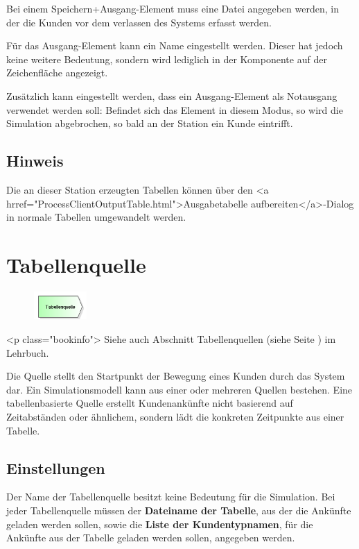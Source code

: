 Bei einem Speichern+Ausgang-Element muss eine Datei angegeben werden, in der die Kunden vor dem verlassen des Systems erfasst werden.

Für das Ausgang-Element kann ein Name eingestellt werden. Dieser hat jedoch keine weitere Bedeutung, sondern wird lediglich
in der Komponente auf der Zeichenfläche angezeigt.

Zusätzlich kann eingestellt werden, dass ein Ausgang-Element als Notausgang verwendet werden soll: Befindet sich das Element
in diesem Modus, so wird die Simulation abgebrochen, so bald an der Station ein Kunde eintrifft.

\subsection*{Hinweis}

Die an dieser Station erzeugten Tabellen können über den <a hrref="ProcessClientOutputTable.html">Ausgabetabelle aufbereiten</a>-Dialog
in normale Tabellen umgewandelt werden.


\section{Tabellenquelle}
\label{ref:ModelElementSourceTable}

\begin{figure}
\vspace{-22pt}
\includegraphics[width=2cm]{imageModelElementSourceTable.png}
\vspace{-22pt}
\end{figure}

<p class="bookinfo">
Siehe auch Abschnitt Tabellenquellen (siehe Seite \pageref{ref:book:9.3.1}) im Lehrbuch.

Die Quelle stellt den Startpunkt der Bewegung eines Kunden durch das System dar.
Ein Simulationsmodell kann aus einer oder mehreren Quellen bestehen.
Eine tabellenbasierte Quelle erstellt Kundenankünfte nicht basierend auf
Zeitabständen oder ähnlichem, sondern lädt die konkreten Zeitpunkte aus einer
Tabelle.

\subsection*{Einstellungen}

Der Name der Tabellenquelle besitzt keine Bedeutung für die Simulation.
Bei jeder Tabellenquelle müssen der \textbf{Dateiname der Tabelle}, aus
der die Ankünfte geladen werden sollen, sowie die \textbf{Liste der Kundentypnamen},
für die Ankünfte aus der Tabelle geladen werden sollen, angegeben werden.

